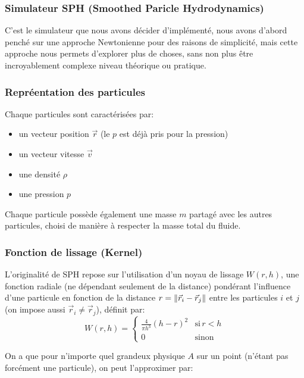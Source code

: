 \documentclass{article}
\begin{document}
\subsubsection{Simulateur SPH (Smoothed Paricle Hydrodynamics)}

C'est le simulateur que nous avons décider d'implémenté, nous avons d'abord penché sur une approche Newtonienne pour des raisons de simplicité, mais cette approche nous permets d'explorer plus de choses, sans non plus être incroyablement complexe niveau théorique ou pratique.

\subsubsection{Repréentation des particules}

Chaque particules sont caractérisées par:

\begin{itemize}
    \item un vecteur position \(\vec{r}\) (le \(p\) est déjà pris pour la pression)
    \item un vecteur vitesse \(\vec{v}\)
    \item une densité \(\rho\)
    \item une pression \(p\)
\end{itemize}

Chaque particule possède également une masse \(m\) partagé avec les autres particules, choisi de manière à respecter la masse total du fluide.

\subsubsection{Fonction de lissage (Kernel)}

L'originalité de SPH repose sur l'utilisation d'un noyau de lissage \(W(r, h)\), une fonction radiale (ne dépendant seulement de la distance) pondérant l'influence d'une particule en fonction de la distance \(r = \norm{\vec{r}_i - \vec{r}_j}\) entre les particules \(i\) et \(j\) (on impose aussi \(\vec{r}_i \ne \vec{r}_j\)), définit par:
\[ W(r, h) = \begin{cases}
        \frac{4}{\pi h^3}(h-r)^2 & \text{si}\, r < h \\
        0 & \text{sinon}
    \end{cases}
\]

On a que pour n'importe quel grandeux physique \(A\) sur un point (n'étant pas forcément une particule), on peut l'approximer par:
\end{document}
